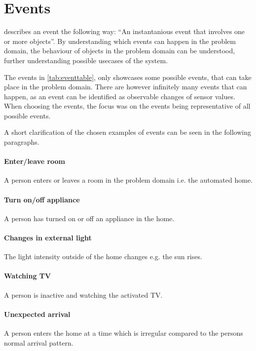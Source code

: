\section{Events}\label{sec:events}

\citet{OOAD} describes an event the following way: \enquote{An instantanious event that involves one or more objects}. By understanding which events can happen in the problem domain, the behaviour of objects in the problem domain can be understood, further understanding possible usecases of the system.

The events in \cref{tab:eventtable}, only showcases some possible events, that can take place in the problem domain. There are however infinitely many events that can happen, as an event can be identified as observable changes of sensor values. When choosing the events, the focus was on the events being representative of all possible events.

A short clarification of the chosen examples of events can be seen in the following paragraphs.

\paragraph{Enter/leave room} A person enters or leaves a room in the problem domain i.e. the automated home.
\paragraph{Turn on/off appliance} A person has turned on or off an appliance in the home.
\paragraph{Changes in external light} The light intensity outside of the home changes e.g. the sun rises.
\paragraph{Watching TV} A person is inactive and watching the activated TV.
\paragraph{Unexpected arrival} A person enters the home at a time which is irregular compared to the persons normal arrival pattern.

